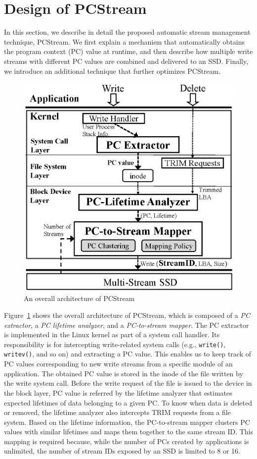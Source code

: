 \section{Design of PCStream}
In this section, we describe in detail the proposed automatic stream management
technique, {\sf PCStream}.  We first explain a mechanism that automatically
obtains the program context (PC) value at runtime, and then describe how
multiple write streams with different PC values are combined and delivered to
an SSD. Finally, we introduce an additional technique that further optimizes
{\sf PCStream}.

\begin{figure}[b]
	\vspace{-15pt}
	\centering
	\includegraphics[width=0.8\linewidth]{figure/architecture3}
	\vspace{-10pt}
	\caption{An overall architecture of {\sf PCStream}}
	\label{fig:architecture}
\end{figure}

Figure~\ref{fig:architecture} shows the overall architecture of {\sf PCStream}, which
is composed of a \textit{PC extractor}, a \textit{PC lifetime analyzer}, and a
\textit{PC-to-stream mapper}.  The PC extractor is implemented in the Linux
kernel as part of a system call handler. Its responsibility is for intercepting
write-related system calls (e.g., \texttt{write()}, \texttt{writev()}, and so
on) and extracting a PC value.  This enables us to keep track of PC values
corresponding to new write streams from a specific module of an application. 
The obtained PC value is stored in the inode of the file written by the write system call.
Before the write request of the file is issued to the device in the block layer, 
PC value is referred 
by the lifetime analyzer that estimates expected
lifetimes of data belonging to a given PC. To know when data is deleted or
removed, the lifetime analyzer also intercepts TRIM requests from a file
system.  Based on the lifetime information, the PC-to-stream mapper clusters PC
values with similar lifetimes and maps them together to the same stream ID.
This mapping is required because, while the number of PCs created by applications is unlimited, the
number of stream IDs exposed by an SSD is limited to 8 or 16.


